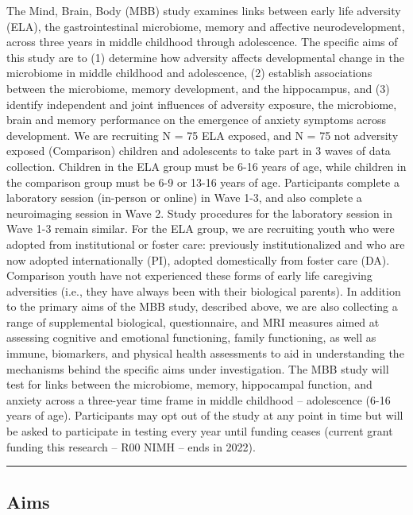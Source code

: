 \documentclass[
]{book}
\begin{document}
The Mind, Brain, Body (MBB) study examines links between early life adversity (ELA), the gastrointestinal microbiome, memory and affective neurodevelopment, across three years in middle childhood through adolescence. The specific aims of this study are to (1) determine how adversity affects developmental change in the microbiome in middle childhood and adolescence, (2) establish associations between the microbiome, memory development, and the hippocampus, and (3) identify independent and joint influences of adversity exposure, the microbiome, brain and memory performance on the emergence of anxiety symptoms across development. We are recruiting N = 75 ELA exposed, and N = 75 not adversity exposed (Comparison) children and adolescents to take part in 3 waves of data collection. Children in the ELA group must be 6-16 years of age, while children in the comparison group must be 6-9 or 13-16 years of age. Participants complete a laboratory session (in-person or online) in Wave 1-3, and also complete a neuroimaging session in Wave 2. Study procedures for the laboratory session in Wave 1-3 remain similar. For the ELA group, we are recruiting youth who were adopted from institutional or foster care: previously institutionalized and who are now adopted internationally (PI), adopted domestically from foster care (DA). Comparison youth have not experienced these forms of early life caregiving adversities (i.e., they have always been with their biological parents). In addition to the primary aims of the MBB study, described above, we are also collecting a range of supplemental biological, questionnaire, and MRI measures aimed at assessing cognitive and emotional functioning, family functioning, as well as immune, biomarkers, and physical health assessments to aid in understanding the mechanisms behind the specific aims under investigation. The MBB study will test for links between the microbiome, memory, hippocampal function, and anxiety across a three-year time frame in middle childhood -- adolescence (6-16 years of age). Participants may opt out of the study at any point in time but will be asked to participate in testing every year until funding ceases (current grant funding this research -- R00 NIMH -- ends in 2022).

\begin{center}\rule{0.5\linewidth}{0.5pt}\end{center}

\hypertarget{aims}{%
\subsection{Aims}\label{aims}}
\end{document}
